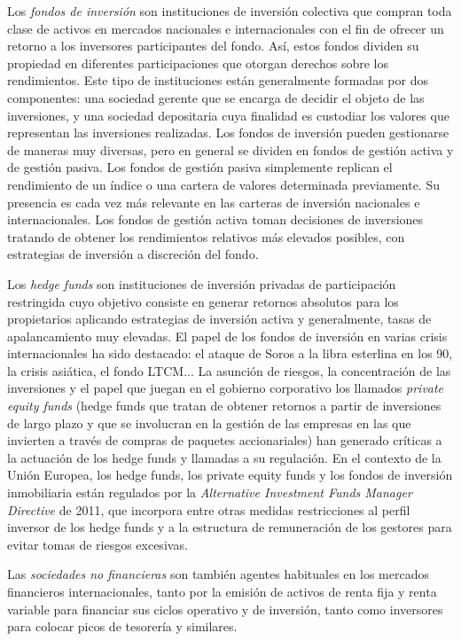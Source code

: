 \documentclass{nuevotema}
\begin{document}
Los \textit{fondos de inversión} son instituciones de inversión colectiva que compran toda clase de activos en mercados nacionales e internacionales con el fin de ofrecer un retorno a los inversores participantes del fondo. Así, estos fondos dividen su propiedad en diferentes participaciones que otorgan derechos sobre los rendimientos. Este tipo de instituciones están generalmente formadas por dos componentes: una sociedad gerente que se encarga de decidir el objeto de las inversiones, y una sociedad depositaria cuya finalidad es custodiar los valores que representan las inversiones realizadas. Los fondos de inversión pueden gestionarse de maneras muy diversas, pero en general se dividen en fondos de gestión activa y de gestión pasiva. Los fondos de gestión pasiva simplemente replican el rendimiento de un índice o una cartera de valores determinada previamente. Su presencia es cada vez más relevante en las carteras de inversión nacionales e internacionales. Los fondos de gestión activa toman decisiones de inversiones tratando de obtener los rendimientos relativos más elevados posibles, con estrategias de inversión a discreción del fondo. 

Los \textit{hedge funds} son instituciones de inversión privadas de participación restringida cuyo objetivo consiste en generar retornos absolutos para los propietarios aplicando estrategias de inversión activa y generalmente, tasas de apalancamiento muy elevadas. El papel de los fondos de inversión en varias crisis internacionales ha sido destacado: el ataque de Soros a la libra esterlina en los 90, la crisis asiática, el fondo LTCM... La asunción de riesgos, la concentración de las inversiones y el papel que juegan en el gobierno corporativo los llamados \textit{private equity funds} (hedge funds que tratan de obtener retornos a partir de inversiones de largo plazo y que se involucran en la gestión de las empresas en las que invierten a través de compras de paquetes accionariales) han generado críticas a la actuación de los hedge funds y llamadas a su regulación. En el contexto de la Unión Europea, los hedge funds, los private equity funds y los fondos de inversión inmobiliaria están regulados por la \textit{Alternative Investment Funds Manager Directive} de 2011, que incorpora entre otras medidas restricciones al perfil inversor de los hedge funds y a la estructura de remuneración de los gestores para evitar tomas de riesgos excesivas. 

Las \textit{sociedades no financieras} son también agentes habituales en los mercados financieros internacionales, tanto por la emisión de activos de renta fija y renta variable para financiar sus ciclos operativo y de inversión, tanto como inversores para colocar picos de tesorería y similares.
\end{document}
